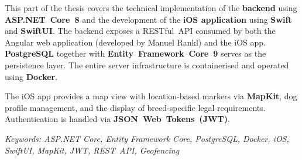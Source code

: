 This part of the thesis covers the technical implementation of the \textbf{backend} using
\textbf{ASP.NET~Core~8} and the development of the \textbf{iOS application} using \textbf{Swift}
and \textbf{SwiftUI}. The backend exposes a RESTful~API consumed by both the Angular web
application (developed by Manuel Rankl) and the iOS app. \textbf{PostgreSQL} together with
\textbf{Entity~Framework~Core~9} serves as the persistence layer. The entire server
infrastructure is containerised and operated using \textbf{Docker}.

The iOS app provides a map view with location-based markers via \textbf{MapKit}, dog profile
management, and the display of breed-specific legal requirements. Authentication is handled
via \textbf{JSON~Web~Tokens~(JWT)}.

\vspace{1.5em}
\noindent\textit{Keywords: ASP.NET Core, Entity Framework Core, PostgreSQL, Docker, iOS, SwiftUI,
MapKit, JWT, REST~API, Geofencing}

\clearpage
